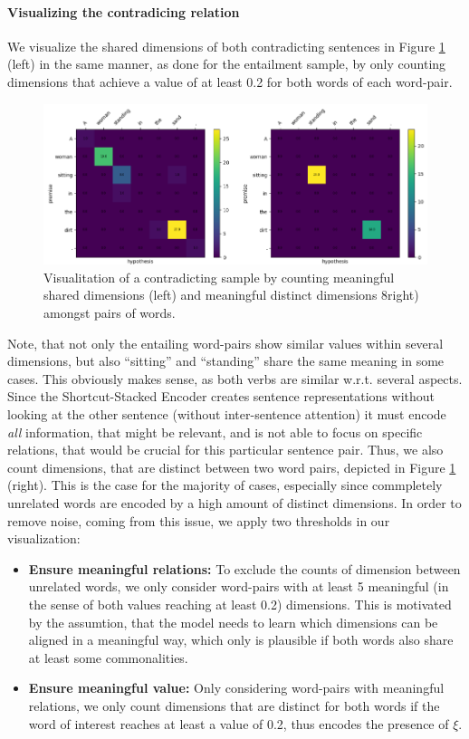 \paragraph*{Visualizing the contradicing relation}
We visualize the shared dimensions of both contradicting sentences in Figure \ref{fig:alignment_contr_sample_general} (left) in the same manner, as done for the entailment sample, by only counting dimensions that achieve a value of at least 0.2 for both words of each word-pair. 
\begin{figure}[tph!]
\centering
	\includegraphics[totalheight=7cm]{fig/alignment_contr_sample_general.png}
	\caption{Visualitation of a contradicting sample by counting meaningful shared dimensions (left) and meaningful distinct dimensions 8right) amongst pairs of words.}
	\label{fig:alignment_contr_sample_general}
\end{figure}
Note, that not only the entailing word-pairs show similar values within several dimensions, but also ``sitting'' and ``standing'' share the same meaning in some cases. This obviously makes sense, as both verbs are similar w.r.t. several aspects. Since the Shortcut-Stacked Encoder creates sentence representations without looking at the other sentence (without inter-sentence attention) it must encode \textit{all} information, that might be relevant, and is not able to focus on specific relations, that would be crucial for this particular sentence pair. Thus, we also count dimensions, that are distinct between two word pairs, depicted in Figure \ref{fig:alignment_contr_sample_general} (right). This is the case for the majority of cases, especially since commpletely unrelated words are encoded by a high amount of distinct dimensions. In order to remove noise, coming from this issue, we apply two thresholds in our visualization:
\begin{itemize}
\item \textbf{Ensure meaningful relations:} To exclude the counts of dimension between unrelated words, we only consider word-pairs with at least 5 meaningful (in the sense of both values reaching at least 0.2) dimensions. This is motivated by the assumtion, that the model needs to learn which dimensions can be aligned in a meaningful way, which only is plausible if both words also share at least some commonalities. 
\item \textbf{Ensure meaningful value:} Only considering word-pairs with meaningful relations, we only count dimensions that are distinct for both words if the word of interest reaches at least a value of 0.2, thus encodes the presence of $\xi$.
\end{itemize}

